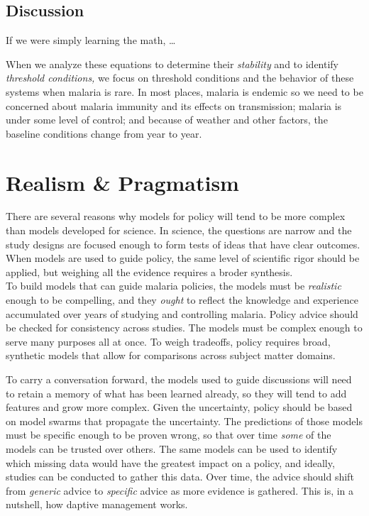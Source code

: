 \documentclass[
]{book}
\begin{document}
\hypertarget{discussion}{%
\section{Discussion}\label{discussion}}

If we were simply learning the math, \ldots{}

When we analyze these equations to determine their \emph{stability} and to identify \emph{threshold conditions,} we focus on threshold conditions and the behavior of these systems when malaria is rare. In most places, malaria is endemic so we need to be concerned about malaria immunity and its effects on transmission; malaria is under some level of control; and because of weather and other factors, the baseline conditions change from year to year.

\hypertarget{realism-pragmatism}{%
\chapter{Realism \& Pragmatism}\label{realism-pragmatism}}

There are several reasons why models for policy will tend to be more complex than models developed for science.
In science, the questions are narrow and the study designs are focused enough to form tests of ideas that have clear outcomes.
When models are used to guide policy, the same level of scientific rigor should be applied, but weighing all the evidence requires a broder synthesis.\\
To build models that can guide malaria policies, the models must be \emph{realistic} enough to be compelling, and they \emph{ought} to reflect the knowledge and experience accumulated over years of studying and controlling malaria.
Policy advice should be checked for consistency across studies.
The models must be complex enough to serve many purposes all at once.
To weigh tradeoffs, policy requires broad, synthetic models that allow for comparisons across subject matter domains.

To carry a conversation forward, the models used to guide discussions will need to retain a memory of what has been learned already, so they will tend to add features and grow more complex.
Given the uncertainty, policy should be based on model swarms that propagate the uncertainty.
The predictions of those models must be specific enough to be proven wrong, so that over time \emph{some} of the models can be trusted over others.
The same models can be used to identify which missing data would have the greatest impact on a policy, and ideally, studies can be conducted to gather this data.
Over time, the advice should shift from \emph{generic} advice to \emph{specific} advice as more evidence is gathered.
This is, in a nutshell, how daptive management works.
\end{document}
